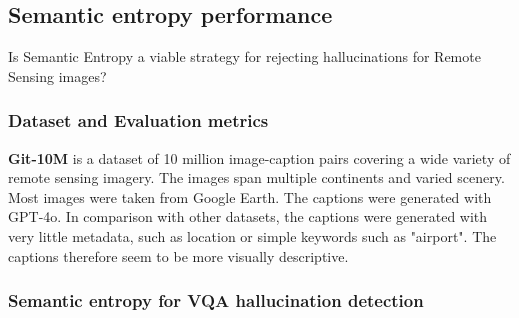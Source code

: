 
\subsection{Semantic entropy performance}

\begin{formal}
	Is Semantic Entropy a viable strategy for rejecting hallucinations for Remote Sensing images?
\end{formal}

\subsubsection{Dataset and Evaluation metrics}


\begin{description}
	\item \textbf{Git-10M} is a dataset of 10 million image-caption pairs covering a wide variety of remote sensing imagery. The images span multiple continents and varied scenery. Most images were taken from Google Earth. The captions were generated with GPT-4o. In comparison with other datasets, the captions were generated with very little metadata, such as location or simple keywords such as "airport". The captions therefore seem to be more visually descriptive.
\end{description}



\subsubsection{Semantic entropy for VQA hallucination detection}

